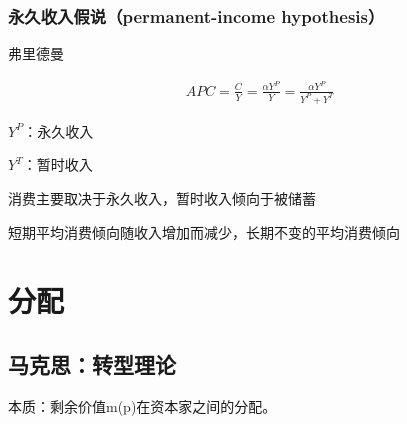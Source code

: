 \documentclass[12pt]{book}
\begin{document}
\subsection{永久收入假说（permanent-income hypothesis）}

弗里德曼

\begin{gather*}
APC=\frac{C}{Y}=\frac{\alpha Y^P}{Y}=\frac{\alpha Y^P}{Y^P+Y^T}
\end{gather*}
\par $Y^P$：永久收入
\par $Y^T$：暂时收入


\par 消费主要取决于永久收入，暂时收入倾向于被储蓄
\par 短期平均消费倾向随收入增加而减少，长期不变的平均消费倾向




\chapter{分配}



\section{马克思：转型理论}


本质：剩余价值m(p)在资本家之间的分配。
\\
\end{document}
